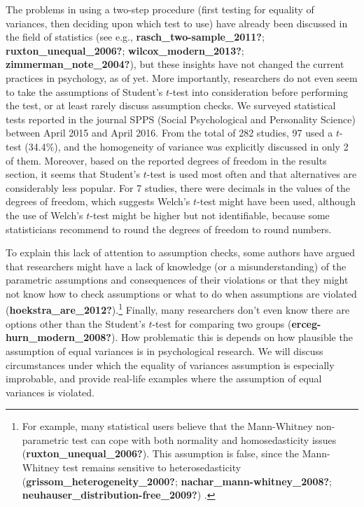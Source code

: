 \documentclass[
  english,
  man]{apa6}
\begin{document}
The problems in using a two-step procedure (first testing for equality of variances, then deciding upon which test to use) have already been discussed in the field of statistics (see e.g., \textbf{rasch\_two-sample\_2011?}; \textbf{ruxton\_unequal\_2006?}; \textbf{wilcox\_modern\_2013?}; \textbf{zimmerman\_note\_2004?}), but these insights have not changed the current practices in psychology, as of yet. More importantly, researchers do not even seem to take the assumptions of Student's \(t\)-test into consideration before performing the test, or at least rarely discuss assumption checks. We surveyed statistical tests reported in the journal SPPS (Social Psychological and Personality Science) between April 2015 and April 2016. From the total of 282 studies, 97 used a \(t\)-test (34.4\(\%\)), and the homogeneity of variance was explicitly discussed in only 2 of them. Moreover, based on the reported degrees of freedom in the results section, it seems that Student's \(t\)-test is used most often and that alternatives are considerably less popular. For 7 studies, there were decimals in the values of the degrees of freedom, which suggests Welch's \(t\)-test might have been used, although the use of Welch's \(t\)-test might be higher but not identifiable, because some statisticians recommend to round the degrees of freedom to round numbers.

To explain this lack of attention to assumption checks, some authors have argued that researchers might have a lack of knowledge (or a misunderstanding) of the parametric assumptions and consequences of their violations or that they might not know how to check assumptions or what to do when assumptions are violated (\textbf{hoekstra\_are\_2012?}).\footnote{ For example, many statistical users believe that the Mann-Whitney non-parametric test can cope with both normality and homosedasticity issues (\textbf{ruxton\_unequal\_2006?}). This assumption is false, since the Mann-Whitney test remains sensitive to heterosedasticity (\textbf{grissom\_heterogeneity\_2000?}; \textbf{nachar\_mann-whitney\_2008?}; \textbf{neuhauser\_distribution-free\_2009?}) .} Finally, many researchers don't even know there are options other than the Student's \(t\)-test for comparing two groups (\textbf{erceg-hurn\_modern\_2008?}). How problematic this is depends on how plausible the assumption of equal variances is in psychological research. We will discuss circumstances under which the equality of variances assumption is especially improbable, and provide real-life examples where the assumption of equal variances is violated.
\end{document}
